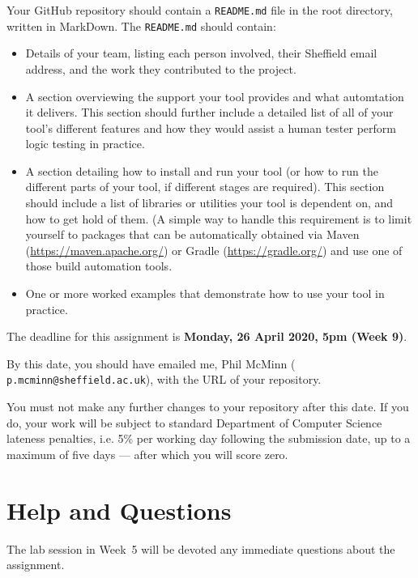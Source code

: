 Your GitHub repository should contain a {\tt README.md} file in the root
directory, written in MarkDown. The {\tt README.md} should contain:

\begin{itemize}
    \item Details of your team, listing each person involved, their Sheffield
    email address, and the work they contributed to the project. 
    
    \item A section overviewing the support your tool provides and what
    automtation it delivers. This section should further include a detailed list
    of all of your tool's different features and how they would assist a human
    tester perform logic testing in practice.

    \item A section detailing how to install and run your tool (or how to run
    the different parts of your tool, if different stages are required). This
    section should include a list of libraries or utilities your tool is
    dependent on, and how to get hold of them. (A simple way to handle this
    requirement is to limit yourself to packages that can be automatically
    obtained via Maven (\url{https://maven.apache.org/}) or Gradle
    (\url{https://gradle.org/}) and use one of those build automation tools. 

    \item One or more worked examples that demonstrate how to use your tool in
    practice. 
\end{itemize}

The deadline for this assignment is {\bf Monday, 26 April 2020, 5pm (Week 9)}.

By this date, you should have emailed me, Phil McMinn ({\tt
p.mcminn@sheffield.ac.uk}), with the URL of your repository.

You must not make any further changes to your repository after this date. If you
do, your work will be subject to standard Department of Computer Science
lateness penalties, i.e. 5\% per working day following the submission date, up
to a maximum of five days --- after which you will score zero.


\section{Help and Questions}

The lab session in Week~5 will be devoted any immediate questions about the
assignment. 

